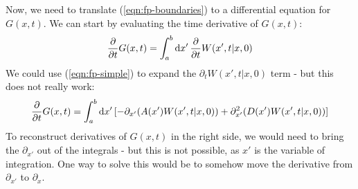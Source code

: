 \documentclass[../template.tex]{subfiles}
\begin{document}
Now, we need to translate (\ref{eqn:fp-boundaries}) to a differential equation for $G(x,t)$. We can start by evaluating the time derivative of $G(x,t)$:
\begin{align} \label{eqn:Gtprime}
    \pdv{t} G(x,t) = \int_a^b \dd{x'} \pdv{t} W(x',t|x,0)
\end{align}
We could use (\ref{eqn:fp-simple}) to expand the $\partial_t W(x',t|x,0)$ term - but this does not really work:
\begin{align*}
    \pdv{t} G(x,t) = \int_a^b \dd{x'} [-\partial_{x'}(A(x')W(x',t|x,0)) + \partial_{x'}^2 (D(x')W(x',t|x,0))]
\end{align*}
To reconstruct derivatives of $G(x,t)$ in the right side, we would need to bring the $\partial_{x'}$ out of the integrals - but this is not possible, as $x'$ is the variable of integration. One way to solve this would be to somehow move the derivative from $\partial_{x'}$ to $\partial_x$.
\end{document}
